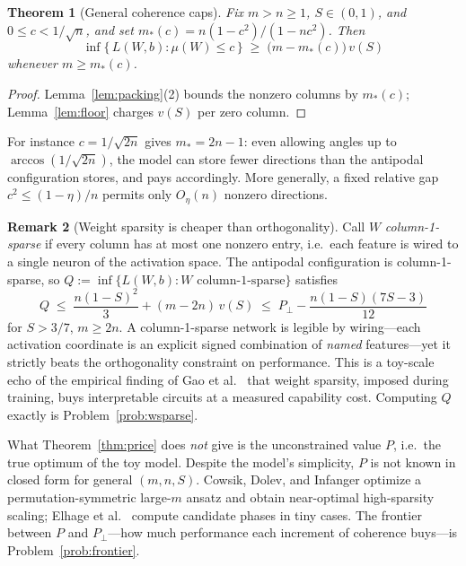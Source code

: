 \documentclass[11pt]{amsart}
\theoremstyle{plain}
\newtheorem{theorem}{Theorem}[section]
\theoremstyle{definition}
\newtheorem{remark}[theorem]{Remark}
\begin{document}
\begin{theorem}[General coherence caps]\label{thm:cap}
Fix $m>n\ge1$, $S\in(0,1)$, and $0\le c<1/\sqrt n$, and set $m_*(c) = n(1-c^2)/(1-nc^2)$. Then
\[
\inf\{\,L(W,b) : \mu(W)\le c\,\} \;\ge\; \bigl(m-m_*(c)\bigr)\,v(S)
\]
whenever $m\ge m_*(c)$.
\end{theorem}

\begin{proof}
Lemma~\ref{lem:packing}(2) bounds the nonzero columns by $m_*(c)$; Lemma~\ref{lem:floor} charges $v(S)$ per zero column.
\end{proof}

For instance $c=1/\sqrt{2n}$ gives $m_*=2n-1$: even allowing angles up to $\arccos(1/\sqrt{2n})$, the model can store fewer directions than the antipodal configuration stores, and pays accordingly. More generally, a fixed relative gap $c^2\le(1-\eta)/n$ permits only $O_\eta(n)$ nonzero directions.

\begin{remark}[Weight sparsity is cheaper than orthogonality]\label{rem:wsparse}
Call $W$ \emph{column-1-sparse} if every column has at most one nonzero entry, i.e.\ each feature is wired to a single neuron of the activation space. The antipodal configuration is column-1-sparse, so $Q := \inf\{L(W,b): W \text{ column-1-sparse}\}$ satisfies
\[
Q \;\le\; \frac{n(1-S)^2}{3}+(m-2n)\,v(S) \;\le\; P_\perp - \frac{n(1-S)(7S-3)}{12}
\]
for $S>3/7$, $m\ge 2n$. A column-1-sparse network is legible by wiring---each activation coordinate is an explicit signed combination of \emph{named} features---yet it strictly beats the orthogonality constraint on performance. This is a toy-scale echo of the empirical finding of Gao et al.~\cite{gao2025} that weight sparsity, imposed during training, buys interpretable circuits at a measured capability cost. Computing $Q$ exactly is Problem~\ref{prob:wsparse}.
\end{remark}

What Theorem~\ref{thm:price} does \emph{not} give is the unconstrained value $P$, i.e.\ the true optimum of the toy model. Despite the model's simplicity, $P$ is not known in closed form for general $(m,n,S)$. Cowsik, Dolev, and Infanger \cite{cowsik2024} optimize a permutation-symmetric large-$m$ ansatz and obtain near-optimal high-sparsity scaling; Elhage et al.~\cite{elhage2022} compute candidate phases in tiny cases. The frontier between $P$ and $P_\perp$---how much performance each increment of coherence buys---is Problem~\ref{prob:frontier}.
\end{document}
